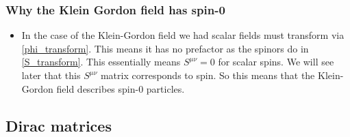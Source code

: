 \documentclass[11pt]{article}
\numberwithin{equation}{section}
\begin{document}
\subsubsection{Why the Klein Gordon field has spin-0}
\begin{itemize}
  \item In the case of the Klein-Gordon field we had scalar fields must transform via \ref{phi_transform}. This means it has no prefactor as the spinors do in \ref{S_transform}. This essentially means $S^{\mu\nu} = 0$ for scalar spins. We will see later that this $S^{\mu\nu}$ matrix corresponds to spin. So this means that the Klein-Gordon field describes spin-0 particles. 
\end{itemize}

\subsection{Dirac matrices}
\end{document}
